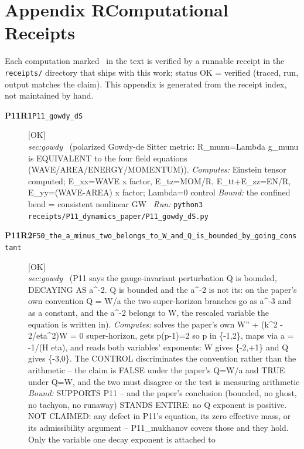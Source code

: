 \clearpage
\section*{Appendix R\quad Computational Receipts}\label{app:receipts}
\small\noindent Each computation marked \rcptmarker\ in the text is verified by a runnable receipt in the \texttt{receipts/} directory that ships with this work; status \textsf{OK} = verified (traced, run, output matches the claim). This appendix is generated from the receipt index, not maintained by hand.\par\medskip
\begingroup\renewcommand{\arraystretch}{1.25}
\begin{description}
\item[\textbf{P11R1}\quad\texttt{P11\_gowdy\_dS}]\hfill\textsf{[OK]}\\
\textit{sec:gowdy} \ (polarized Gowdy-de Sitter metric: R\_munu=Lambda g\_munu is EQUIVALENT to the four field equations (WAVE/AREA/ENERGY/MOMENTUM)). 
\emph{Computes:} Einstein tensor computed; E\_xx=WAVE x factor, E\_tz=MOM/R, E\_tt+E\_zz=EN/R, E\_yy=(WAVE-AREA) x factor; Lambda=0 control
 \emph{Bound:} the confined bend = consistent nonlinear GW
\ \emph{Run:} \texttt{python3 receipts/P11\_dynamics\_paper/P11\_gowdy\_dS.py}
\item[\textbf{P11R2}\quad\texttt{F50\_the\_a\_minus\_two\_belongs\_to\_W\_and\_Q\_is\_bounded\_by\_going\_constant}]\hfill\textsf{[OK]}\\
\textit{sec:gowdy} \ (P11 says the gauge-invariant perturbation Q is bounded, DECAYING AS a\textasciicircum{}-2. Q is bounded and the a\textasciicircum{}-2 is not its: on the paper's own convention Q = W/a the two super-horizon branches go as a\textasciicircum{}-3 and as a constant, and the a\textasciicircum{}-2 belongs to W, the rescaled variable the equation is written in). 
\emph{Computes:} solves the paper's own W'' + (k\textasciicircum{}2 - 2/eta\textasciicircum{}2)W = 0 super-horizon, gets p(p-1)=2 so p in \{-1,2\}, maps via a = -1/(H eta), and reads both variables' exponents: W gives \{-2,+1\} and Q gives \{-3,0\}. The CONTROL discriminates the convention rather than the arithmetic -- the claim is FALSE under the paper's Q=W/a and TRUE under Q=W, and the two must disagree or the test is measuring arithmetic
 \emph{Bound:} SUPPORTS P11 -- and the paper's conclusion (bounded, no ghost, no tachyon, no runaway) STANDS ENTIRE: no Q exponent is positive. NOT CLAIMED: any defect in P11's equation, its zero effective mass, or its admissibility argument -- P11\_mukhanov covers those and they hold. Only the variable one decay exponent is attached to

\end{description}
